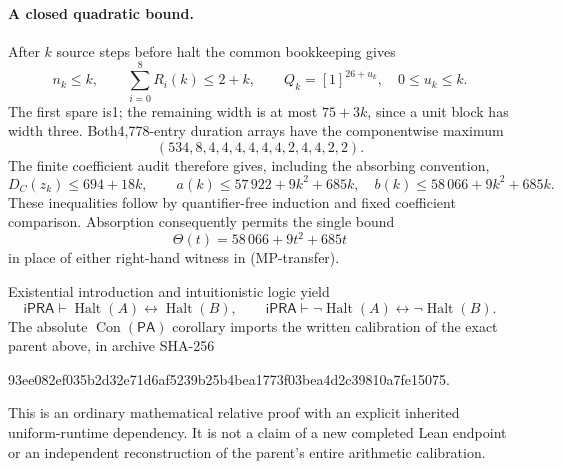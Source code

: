 \paragraph{A closed quadratic bound.}
After $k$ source steps before halt the common bookkeeping gives
\[
 n_k\le k,\qquad \sum_{i=0}^8R_i(k)\le2+k,\qquad
 Q_k=[1]^{26+u_k},\quad0\le u_k\le k.
\]
The first spare is1; the remaining width is at most $75+3k$, since a
unit block has width three. Both4,778-entry duration arrays have the
componentwise maximum
\[
 (534,8,4,4,4,4,4,4,2,4,4,2,2).
\]
The finite coefficient audit therefore gives, including the absorbing
convention,
\[
 D_C(z_k)\le694+18k,\qquad
 a(k)\le57\,922+9k^2+685k,\quad
 b(k)\le58\,066+9k^2+685k.
\]
These inequalities follow by quantifier-free induction and fixed
coefficient comparison. Absorption consequently permits the single bound
\[
 \boxed{\Theta(t)=58\,066+9t^2+685t}
\]
in place of either right-hand witness in (MP-transfer).

Existential introduction and intuitionistic logic yield
\[
 \mathsf{iPRA}\vdash\operatorname{Halt}(A)\leftrightarrow\operatorname{Halt}(B),
 \qquad
 \mathsf{iPRA}\vdash\neg\operatorname{Halt}(A)\leftrightarrow\neg\operatorname{Halt}(B).
\]
The absolute $\operatorname{Con}(\mathsf{PA})$ corollary imports the
written calibration of the exact parent above, in archive SHA-256
\begin{center}\small\ttfamily
93ee082ef035b2d32e71d6af5239b25b4bea1773f03bea4d2c39810a7fe15075.
\end{center}
This is an ordinary mathematical relative proof with an explicit inherited
uniform-runtime dependency. It is not a claim of a new completed Lean
endpoint or an independent reconstruction of the parent's entire
arithmetic calibration.
